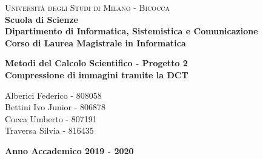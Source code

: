\documentclass[a4paper,12pt]{report}
\renewcommand{\baselinestretch}{1.5}
\begin{document}
\begin{titlepage}
\noindent
    \vspace*{5mm}
	\begin{minipage}[t]{0.15\textwidth}
	    \vspace*{5mm}
	\end{minipage}
	\hspace{1cm}
	\begin{minipage}[t]{0.9\textwidth}
	      \vspace*{5mm}
		{
			{\textsc{Università degli Studi di Milano - Bicocca} } \\
			\textbf{Scuola di Scienze} \\
			\textbf{Dipartimento di Informatica, Sistemistica e Comunicazione} \\
			\textbf{Corso di Laurea Magistrale in Informatica} \\
			\par
		}
	\end{minipage}
	
	\vspace{42mm}

\begin{center}
    {\LARGE{
            \textbf{
            	Metodi del Calcolo Scientifico - Progetto 2 \\ 
            	Compressione di immagini tramite la DCT \\ }
    }}        
\end{center}

\vspace{40mm}
	
	
	\begin{flushright}
		\large{Alberici Federico - 808058\\} 
		\large{Bettini Ivo Junior - 806878\\} 
		\large{Cocca Umberto - 807191\\} 
		\large{Traversa Silvia - 816435} 
	\end{flushright}
	
	\vspace{15mm}
	\begin{center}
		{\large{\bf Anno Accademico 2019 - 2020}}
	\end{center}


\renewcommand{\baselinestretch}{1.5}

\end{titlepage}
\end{document}
